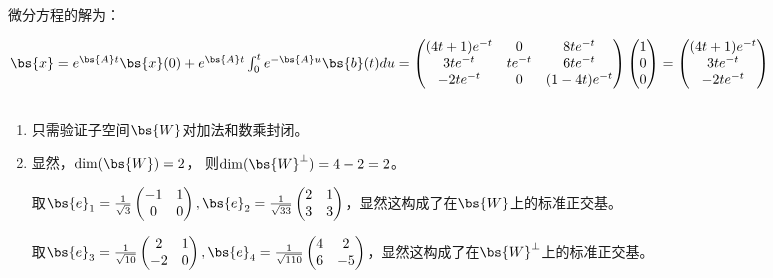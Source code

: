 \documentclass[12pt, a4paper, oneside, UTF8]{ctexbook}
\begin{document}
微分方程的解为：

$\bs{x}=e^{\bs{A}t}\bs{x}(0)+e^{\bs{A}t} \int_{0}^t e^{-\bs{A}u}\bs{b}(t)du
=\begin{pmatrix}
    (4t+1)e^{-t} & 0 & 8te^{-t} \\
    3te^{-t} & te^{-t} & 6te^{-t} \\
    -2te^{-t}& 0 &(1-4t)e^{-t}
\end{pmatrix} \begin{pmatrix}
    1 \\
    0\\
    0
\end{pmatrix}=
\begin{pmatrix}
    (4t+1)e^{-t}  \\
    3te^{-t}  \\
    -2te^{-t}
\end{pmatrix}$

\subsection{}
\begin{enumerate}
\item 只需验证子空间$\bs{W}$对加法和数乘封闭。
\item 显然，$\dim(\bs{W})=2$，
则$\dim(\bs{W}^{\perp})=4-2=2$。

取$\bs{e}_1=\frac{1}{\sqrt{3}}\begin{pmatrix}
    -1 & 1\\
    0 & 0
\end{pmatrix},\bs{e}_2=\frac{1}{\sqrt{33}}\begin{pmatrix}
    2 & 1\\
    3 & 3
\end{pmatrix}$，显然这构成了在$\bs{W}$上的标准正交基。

取$\bs{e}_3=\frac{1}{\sqrt{10}}\begin{pmatrix}
    2 & 1\\
    -2 & 0
\end{pmatrix},\bs{e}_4=\frac{1}{\sqrt{110}}\begin{pmatrix}
    4 & 2\\
    6 & -5
\end{pmatrix}$，显然这构成了在$\bs{W}^{\perp}$上的标准正交基。
\end{enumerate}
\end{document}
